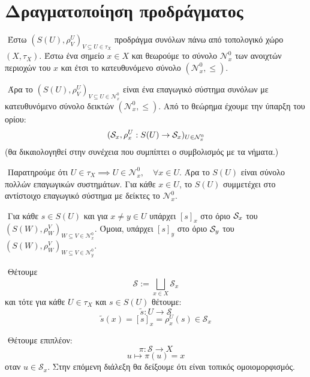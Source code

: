 \section*{Δραγματοποίηση προδράγματος}

$ $\newline
Έστω $(S(U),\rho^U_V)_{V\subseteq U\in \tau_X}$ προδράγμα συνόλων πάνω από τοπολογικό χώρο $(X,\tau_X)$. Έστω ένα σημείο $x \in X$ και θεωρούμε το σύνολο $\mathcal{N}^0_x$ των ανοιχτών περιοχών του $x$ και έτσι το κατευθυνόμενο σύνολο $(\mathcal{N}^0_x,\leq)$.

$ $\newline
Άρα το $(S(U),\rho^U_V)_{V\subseteq U \in \mathcal{N}^0_x}$ είναι ένα επαγωγικό σύστημα συνόλων με κατευθυνόμενο σύνολο δεικτών $(\mathcal{N}^0_x,\leq)$. Από το θεώρημα έχουμε την ύπαρξη του ορίου:
$$(\mathcal{S}_x,\rho^U_x: S(U)\rightarrow \mathcal{S}_x)_{U \in \mathcal{N}^0_x}$$ (θα δικαιολογηθεί στην συνέχεια που συμπίπτει ο συμβολισμός με τα νήματα.)

$ $\newline
Παρατηρούμε ότι $U\in \tau_X \implies U \in \mathcal{N}^0_x, \quad \forall x \in U$. Άρα το $S(U)$ είναι σύνολο πολλών επαγωγικών συστημάτων. Για κάθε $x \in U$, το $S(U)$ συμμετέχει στο αντίστοιχο επαγωγικό σύστημα με δείκτες το $\mathcal{N}^0_x$.

$ $\newline
Για κάθε $s \in S(U)$ και για $x\neq y \in U$ υπάρχει $[s]_x$ στο όριο $\mathcal{S}_x$ του $(S(W),\rho^V_W)_{W\subseteq V \in \mathcal{N}^0_x}$. Όμοια, υπάρχει $[s]_y$ στο όριο $\mathcal{S}_y$ του $(S(W),\rho^V_W)_{W\subseteq V \in \mathcal{N}^0_y}$.

$ $\newline
Θέτουμε 
$$\mathcal{S} := \bigsqcup\limits_{x \in X} \mathcal{S}_x$$ και τότε για κάθε $U \in \tau_X$ και $s \in S(U)$ θέτουμε:
$$\tilde{s}: U \longrightarrow \mathcal{S}$$
$$\tilde{s}(x) = [s]_x = \rho^U_x(s) \in \mathcal{S}_x$$



\begin{figure}[H]
    \centering
\end{figure}

$ $\newline
Θέτουμε επιπλέον: 
$$\pi:\mathcal{S} \longrightarrow X$$
$$u\longmapsto \pi(u) = x$$ οταν $u \in \mathcal{S}_x$. Στην επόμενη διάλεξη θα δείξουμε ότι είναι τοπικός ομοιομορφισμός. 